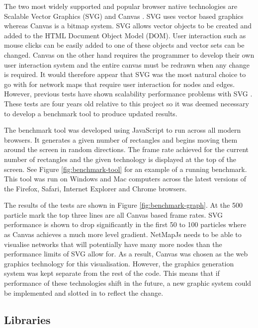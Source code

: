 \documentclass[11pt, a4paper]{article}
\begin{document}
The two most widely supported and popular browser native technologies are
Scalable Vector Graphics (SVG) \cite{Ferraiolo_2003} and Canvas
\cite{Canvas_website}. SVG uses vector based graphics whereas Canvas is a bitmap
system. SVG allows vector objects to be created and added to the HTML Document
Object Model (DOM). User interaction such as mouse clicks can be easily added to
one of these objects and vector sets can be changed. Canvas on the other hand
requires the programmer to develop their own user interaction system and the
entire canvas must be redrawn when any change is required. It would therefore
appear that SVG was the most natural choice to go with for network maps that
require user interaction for nodes and edges. However, previous tests have shown
scalability performance problems with SVG \cite{Johnson_2008}. These tests are
four years old relative to this project so it was deemed necessary to develop a
benchmark tool to produce updated results.

The benchmark tool was developed using JavaScript to run across all modern
browsers. It generates a given number of rectangles and begins moving them
around the screen in random directions. The frame rate achieved for the current
number of rectangles and the given technology is displayed at the top of the
screen. See Figure \ref{fig:benchmark-tool} for an example of a running
benchmark. This tool was run on Windows and Mac computers across the latest
versions of the Firefox, Safari, Internet Explorer and Chrome browsers. 

The results of the tests are shown in Figure \ref{fig:benchmark-graph}. At the
500 particle mark the top three lines are all Canvas based frame rates. SVG
performance is shown to drop significantly in the first 50 to 100 particles
where as Canvas achieves a much more level gradient. NetMapJs needs to be able
to visualise networks that will potentially have many more nodes than the
performance limits of SVG allow for. As a result, Canvas was chosen as the web
graphics technology for this visualisation. However, the graphics generation
system was kept separate from the rest of the code. This means that if
performance of these technologies shift in the future, a new graphic system
could be implemented and slotted in to reflect the change.


\subsection{Libraries}
\label{sec:libraries}
\end{document}
